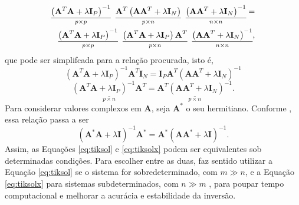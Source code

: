 \begin{equation}
\begin{aligned}
\underset{p \times p}{\underline{\left(\mathbf{A}^T  \mathbf{A} + \lambda \mathbf{I}_P\right)^{-1}}} \hspace{2mm} \underset{p \times n}{\underline{\mathbf{A}^T  \left(\mathbf{A} \mathbf{A}^T +  \lambda \mathbf{I}_N\right)}} \hspace{2mm}  \underset{n \times n}{ \underline{\left(\mathbf{A}  \mathbf{A}^T +  \lambda \mathbf{I}_N\right)^{-1}}} = \\  \underset{p \times p}{\underline{\left(\mathbf{A}^T   \mathbf{A} + \lambda \mathbf{I}_P\right)^{-1}}} \hspace{2mm} \underset{p \times n}{\underline{ \left(\mathbf{A}^T \mathbf{A} + \lambda \mathbf{I}_P\right) \mathbf{A}^T}}  \hspace{2mm}  \underset{n \times n}{ \underline{ \left(\mathbf{A} \mathbf{A}^T +  \lambda \mathbf{I}_N\right)^{-1}}},
\end{aligned}
\end{equation}
que pode ser simplifcada para a relação procurada, isto é, 
\begin{equation}
\left(\mathbf{A}^T  \mathbf{A} + \lambda \mathbf{I}_P\right)^{-1} \mathbf{A}^T  \mathbf{I}_N = \mathbf{I}_P \mathbf{A}^T \left(\mathbf{A} \mathbf{A}^T +  \lambda \mathbf{I}_N\right)^{-1}
\end{equation}
\begin{equation}
\underset{p \times n}{\underline{\left(\mathbf{A}^T  \mathbf{A} + \lambda \mathbf{I}_P\right)^{-1}\mathbf{A}^T}}  = \underset{p \times n}{\underline{\mathbf{A}^T \left(\mathbf{A} \mathbf{A}^T +  \lambda \mathbf{I}_N\right)^{-1}}}.
\end{equation}
Para considerar valores complexos em $\mathbf{A}$, seja $\mathbf{A}^*$ o seu hermitiano.  Conforme \cite[Apêndice 2]{Grech2008}, essa relação passa a ser
\begin{equation}
\left( \mathbf{A}^* \mathbf{A} + \lambda \mathbf{I} \right)^{-1} \mathbf{A}^* = \mathbf{A}^* \left( \mathbf{A} \mathbf{A}^* + \lambda \mathbf{I} \right)^{-1}.
\label{eq:igualdade}
\end{equation}
Assim, as Equações \eqref{eq:tiksol} e \eqref{eq:tiksolx} podem ser equivalentes sob determinadas condições. Para escolher entre as duas, faz sentido utilizar a Equação \eqref{eq:tiksol} se o sistema for sobredeterminado, com $m \gg n$, e a Equação \eqref{eq:tiksolx} para sistemas subdeterminados, com $n \gg m$ \cite[pág. 150]{calvetti2007introduction}, para poupar tempo computacional e melhorar a acurácia e estabilidade da inversão. 

